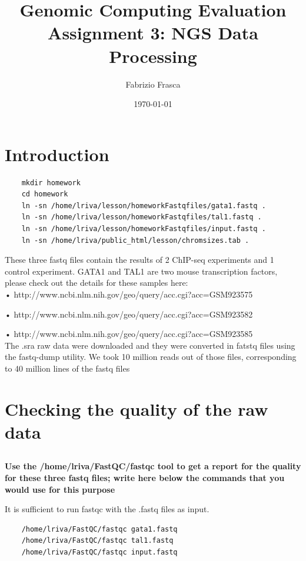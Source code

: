 \documentclass[12pt, a4paper]{article}
\title{\textbf{Genomic Computing Evaluation}\\Assignment 3: NGS Data Processing}
\author{Fabrizio Frasca}
\date{\today}
\begin{document}
	
	\maketitle
	\clearpage
	
	\section*{Introduction}
	
	\begin{verbatim}
	mkdir homework
	cd homework
	ln -sn /home/lriva/lesson/homeworkFastqfiles/gata1.fastq .
	ln -sn /home/lriva/lesson/homeworkFastqfiles/tal1.fastq .
	ln -sn /home/lriva/lesson/homeworkFastqfiles/input.fastq .
	ln -sn /home/lriva/public_html/lesson/chromsizes.tab .
	\end{verbatim}
	
	These three fastq files contain the results of 2 ChIP-seq experiments and 1 control experiment.
	GATA1 and TAL1 are two mouse transcription factors, please check out the details for these samples here:\\
	
	• http://www.ncbi.nlm.nih.gov/geo/query/acc.cgi?acc=GSM923575
	
	• http://www.ncbi.nlm.nih.gov/geo/query/acc.cgi?acc=GSM923582
	
	• http://www.ncbi.nlm.nih.gov/geo/query/acc.cgi?acc=GSM923585\\
	
	
	The .sra raw data were downloaded and they were converted in fatstq files using the fastq-dump utility. We took 10 million reads out of those files, corresponding to 40 million lines of the fastq files
	
	\section{Checking the quality of the raw data}
	
	\subsection{}
	
	\textbf{Use the /home/lriva/FastQC/fastqc tool to get a report for the quality for these three fastq files; write here below the commands that you would use for this purpose}
	
	It is sufficient to run fastqc with the .fastq files as input.
	
	\begin{verbatim}
	/home/lriva/FastQC/fastqc gata1.fastq
	/home/lriva/FastQC/fastqc tal1.fastq
	/home/lriva/FastQC/fastqc input.fastq
	\end{verbatim}
	
\end{document}
